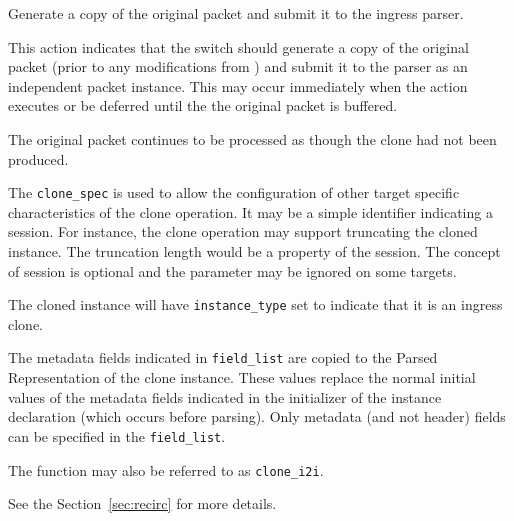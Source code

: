 \documentclass[12pt]{article}
\begin{document}

{ %
Generate a copy of the original packet and submit it to the ingress parser.
}
{ %
}
{ %
This action indicates that the switch should generate a copy of the original
packet (prior to any modifications from \matchaction) and submit it to the
parser as an independent packet instance.  This may occur immediately when
the action executes or be deferred until the the original packet is buffered.


The original packet continues to be processed as though the clone had not
been produced.

The \texttt{clone_spec} is used to allow the configuration of other target specific
characteristics of the clone operation. It may be a simple identifier indicating
a session. For instance, the clone operation may support truncating the cloned
instance. The truncation length would be a property of the session. The concept
of session is optional and the parameter may be ignored on some targets.

The cloned instance will have \texttt{instance_type} set to indicate that it is an
ingress clone.

The metadata fields indicated in \texttt{field_list} are copied to the Parsed Representation
of the clone instance. These values replace the normal initial values of the
metadata fields indicated in the initializer of the instance declaration (which
occurs before parsing). Only metadata (and not header) fields can be specified in the \texttt{field_list}.

The function may also be referred to as \texttt{clone_i2i}.

See the Section~\ref{sec:recirc} for more details.
}

\end{document}
